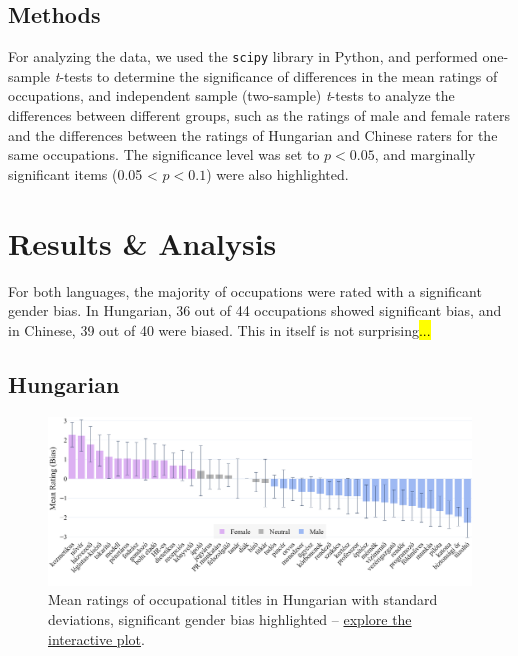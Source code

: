 \documentclass[11pt]{article}
\begin{document}
\subsection{Methods}

For analyzing the data, we used the \texttt{scipy} library in Python, and performed one-sample \textit{t}-tests to determine the significance of differences in the mean ratings of occupations, and independent sample (two-sample) \textit{t}-tests to analyze the differences between different groups, such as the ratings of male and female raters and the differences between the ratings of Hungarian and Chinese raters for the same occupations. The significance level was set to $p < 0.05$, and marginally significant items (0.05 < $p < 0.1$) were also highlighted.


\section{Results \& Analysis}\label{sec:results}

For both languages, the majority of occupations were rated with a significant gender bias. In Hungarian, 36 out of 44 occupations showed significant bias, and in Chinese, 39 out of 40 were biased. This in itself is not surprising\hl{...}

\subsection{Hungarian}

\begin{figure}[!ht]
  \centering
  \includegraphics[width=\linewidth]{../occupations_hu}
  \caption{Mean ratings of occupational titles in Hungarian with standard deviations, significant gender bias highlighted -- \href{https://anonymous.4open.science/api/repo/occupational-bias-paclic39/file/occupations_hu.html?v=93359859}{explore the interactive plot}.}
  \label{fig:occupations_hu}
\end{figure}
\end{document}
